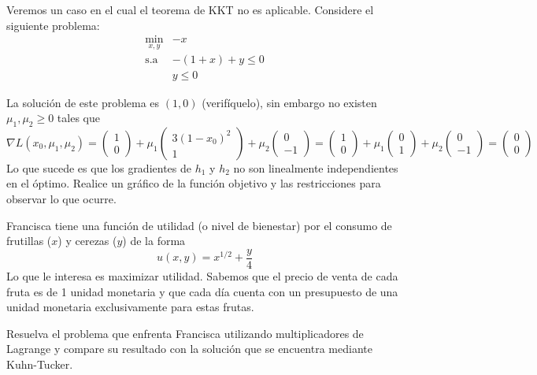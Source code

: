\begin{ejemplo}
Veremos un caso en el cual el teorema de KKT no es aplicable. Considere el siguiente problema:
\begin{equation*}
	\begin{array}{cl}
	\displaystyle \min_{x,y} & -x  \\
	\text{s.a}				 	 & -(1+x)+y \leq 0 \\
	& y \leq 0
	\end{array}
\end{equation*}

La soluci\'on de este problema es $(1,0)$ (verif\'iquelo), sin embargo no existen $\mu_1 , \mu_2 \geq 0$ tales que 
$$\nabla L(x_0,\mu_1,\mu_2) =
\begin{pmatrix}
1 \\
0
\end{pmatrix}
+ \mu_1 \begin{pmatrix}
3(1-x_0)^2 \\
1
\end{pmatrix}
+ \mu_2 \begin{pmatrix}
0 \\
-1
\end{pmatrix}
= 
\begin{pmatrix}
1 \\
0
\end{pmatrix}
+ \mu_1 \begin{pmatrix}
0 \\
1
\end{pmatrix}
+ \mu_2 \begin{pmatrix}
0 \\
-1
\end{pmatrix}
=
\begin{pmatrix}
0 \\
0
\end{pmatrix}
$$
Lo que sucede es que los gradientes de $h_1$ y $h_2$ no son linealmente independientes en el \'optimo. Realice un gr\'afico de la funci\'on objetivo y las restricciones para observar lo que ocurre.
\end{ejemplo}

\begin{ejemplo}
Francisca tiene una funci\'on de utilidad (o nivel de bienestar) por el consumo de frutillas ($x$) y cerezas ($y$) de la forma 
$$u(x,y)=x^{1/2}+\displaystyle \frac{y}{4}$$
Lo que le interesa es maximizar utilidad. Sabemos que el precio de venta de cada fruta es de 1 unidad monetaria y que cada d\'ia cuenta con un presupuesto de una unidad monetaria exclusivamente para estas frutas.

Resuelva el problema que enfrenta Francisca utilizando multiplicadores de Lagrange y compare su resultado con la soluci\'on que se encuentra mediante Kuhn-Tucker.
\end{ejemplo}

